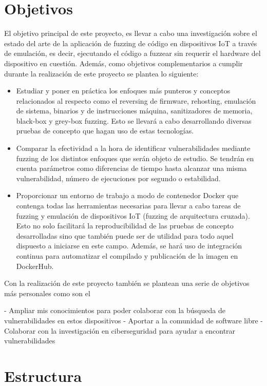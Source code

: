 \section{Objetivos}
El objetivo principal de este proyecto, es llevar a cabo una investigación sobre el estado del arte de la aplicación de fuzzing de código en dispositivos IoT
a través de emulación, es decir, ejecutando el código a fuzzear sin requerir el hardware del dispositivo en cuestión.
Además, como objetivos complementarios a cumplir durante la realización de este proyecto se plantea lo siguiente:
\begin{itemize}
    \item Estudiar y poner en práctica los enfoques más punteros y 
    conceptos relacionados al respecto como el reversing de firmware, rehosting, emulación de sistema, binarios y de instrucciones máquina, 
    sanitizadores de memoria, black-box y grey-box fuzzing. Esto se llevará a cabo desarrollando diversas pruebas de concepto que hagan uso
    de estas tecnologías.
    \item Comparar la efectividad a la hora de identificar vulnerabilidades mediante fuzzing de los distintos enfoques que serán objeto de estudio. 
    Se tendrán en cuenta parámetros como diferencias de tiempo hasta alcanzar una misma vulnerabilidad, número de ejecuciones por segundo o estabilidad.
    \item Proporcionar un entorno de trabajo a modo de contenedor Docker que contenga todas las herramientas necesarias para llevar a cabo tareas de 
    fuzzing y emulación de dispositivos IoT (fuzzing de arquitectura cruzada). Esto no solo facilitará la reproducibilidad de las pruebas de 
    concepto desarrolladas sino que también puede ser de utilidad para todo aquel dispuesto a iniciarse en este campo. Además, se hará uso de 
    integración continua para automatizar el compilado y publicación de la imagen en DockerHub.
\end{itemize}

Con la realización de este proyecto también se plantean una serie de objetivos más personales como son el 


- Ampliar mis conocimientos para poder colaborar con la búsqueda de vulnerabilidades en estos dispositivos
- Aportar a la comunidad de software libre
- Colaborar con la investigación en ciberseguridad para ayudar a encontrar vulnerabilidades
 

\section{Estructura}
